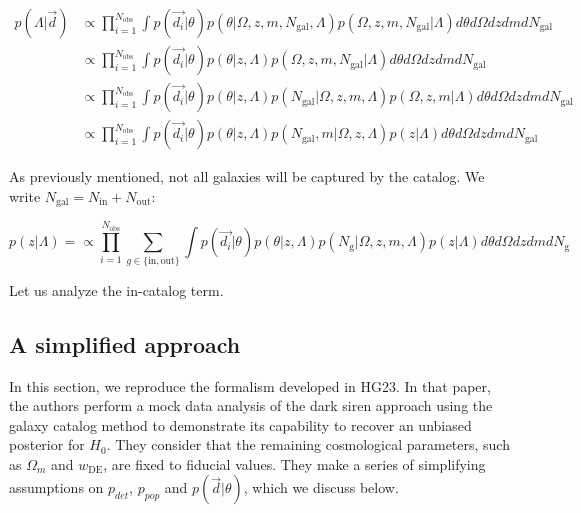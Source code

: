 \documentclass[%
preprint,
nofootinbib,
 amsmath,amssymb,
 aps,
]{revtex4-2}
\newcommand{\given}[2]{p( #1 | #2 )}
\newcommand{\nobs}[0]{N_{\text{obs}}}
\begin{document}
\begin{align}
	\given{\Lambda}{\vec{d}} & \propto \prod_{i=1}^{\nobs} \int \given{\vec{d_i}}{\theta} \given{\theta}{\Omega, z, m, N_\text{gal}, \Lambda} \given{\Omega, z, m, N_\text{gal}}{\Lambda} d\theta d\Omega  dz dm dN_\text{gal}      \\
	                         & \propto \prod_{i=1}^{\nobs} \int \given{\vec{d_i}}{\theta} \given{\theta}{z, \Lambda} \given{\Omega, z, m, N_\text{gal}}{\Lambda} d\theta d\Omega  dz dm dN_\text{gal}                               \\
	                         & \propto \prod_{i=1}^{\nobs} \int \given{\vec{d_i}}{\theta} \given{\theta}{z, \Lambda} \given{N_\text{gal}}{\Omega, z, m, \Lambda} \given{\Omega, z, m}{\Lambda} d\theta d\Omega  dz dm dN_\text{gal} \\
	                         & \propto \prod_{i=1}^{\nobs} \int \given{\vec{d_i}}{\theta} \given{\theta}{z, \Lambda} \given{N_\text{gal}, m}{\Omega, z, \Lambda} \given{z}{\Lambda} d\theta d\Omega  dz dm dN_\text{gal}
\end{align}

As previously mentioned, not all galaxies will be captured by the catalog. We write $N_\text{gal} =
	N_\text{in} + N_\text{out}$:

\begin{equation}
	\given{z}{\Lambda} = \propto \prod_{i=1}^{\nobs} \sum_{g \in \{\text{in}, \text{out}\}} \int \given{\vec{d_i}}{\theta} \given{\theta}{z, \Lambda} \given{N_\text{g}}{\Omega, z, m, \Lambda} \given{z}{\Lambda} d\theta d\Omega  dz dm dN_\text{g}
\end{equation}

Let us analyze the in-catalog term.

\subsection{A simplified approach}
\label{sec:stat:simplified}

In this section, we reproduce the formalism developed in HG23. In that paper, the authors perform a
mock data analysis of the dark siren approach using the galaxy catalog method to demonstrate its
capability to recover an unbiased posterior for $H_0$. They consider that the remaining
cosmological parameters, such as $\Omega_m$ and $w_\text{DE}$, are fixed to fiducial values. They
make a series of simplifying assumptions on $p_{det}$, $p_{pop}$ and $\given{\vec{d}}{\theta}$,
which we discuss below.
\end{document}
